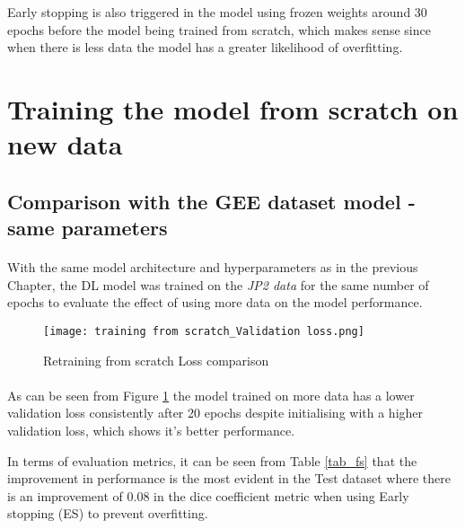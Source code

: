 Early stopping is also triggered in the model using frozen weights around 30 epochs before the model being trained from scratch, which makes sense since when there is less data the model has a greater likelihood of overfitting.

\section{Training the model from scratch on new data} \label{new_data_fs}
\subsection{Comparison with the GEE dataset model - same parameters}
\paragraph{}
With the same model architecture and hyperparameters as in the previous Chapter, the DL model was trained on the \textit{JP2 data} for the same number of epochs to evaluate the effect of using more data on the model performance.

\begin{figure}[hbt!]
    \centering
    \texttt{[image: training from scratch\_Validation loss.png]}
    \caption{Retraining from scratch Loss comparison}
    \label{fs_loss}
\end{figure}
\paragraph{}
As can be seen from Figure \ref{fs_loss} the model trained on more data has a lower validation loss consistently after 20 epochs despite initialising with a higher validation loss, which shows it's better performance. 

In terms of evaluation metrics, it can be seen from Table \ref{tab_fs} that the improvement in performance is the most evident in the Test dataset where there is an improvement of 0.08 in the dice coefficient metric when using Early stopping (ES) to prevent overfitting.


